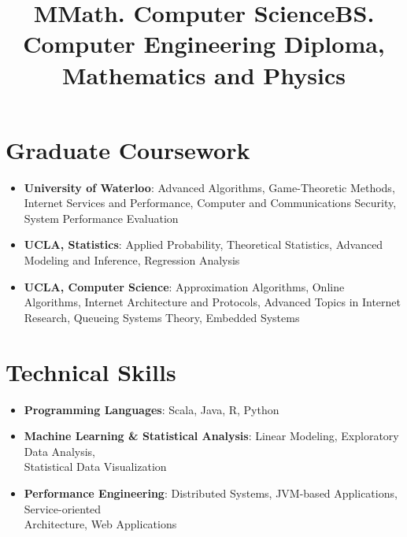 \documentclass[margin]{res}
\begin{document}
\begin{resume}
\vspace{-1.0cm}

\title{\bf  MMath. Computer Science}
\begin{position}
\end{position}

\vspace{-1.0cm}

\title{\bf BS. Computer Engineering }
\employer{}
\begin{position}
\end{position}

\vspace{-1.0cm}

\title{\bf Diploma, Mathematics and Physics }
\employer{}
\begin{position}
\end{position}

\vspace{-0.5cm}

\section{\sc \large Graduate Coursework}
\begin{itemize}
\item {\bf University of Waterloo}: Advanced Algorithms, Game-Theoretic Methods, Internet Services and Performance, Computer and Communications Security, System Performance Evaluation
\item {\bf UCLA, Statistics}: Applied Probability, Theoretical Statistics, Advanced Modeling and Inference, Regression Analysis

\item {\bf UCLA, Computer Science}: Approximation Algorithms, Online Algorithms, Internet Architecture and Protocols, Advanced Topics in Internet Research, Queueing Systems Theory, Embedded Systems
\end{itemize}

\section{\sc \large Technical Skills}
\begin{itemize}
\item {\bf Programming Languages}: Scala, Java, R, Python
\item {\bf Machine Learning \& Statistical Analysis}:
Linear Modeling, Exploratory Data Analysis,\\ Statistical Data Visualization 
\item {\bf Performance Engineering}: Distributed Systems, JVM-based Applications, Service-oriented\\ Architecture, Web Applications
\end{itemize}


\end{resume}
\end{document}
